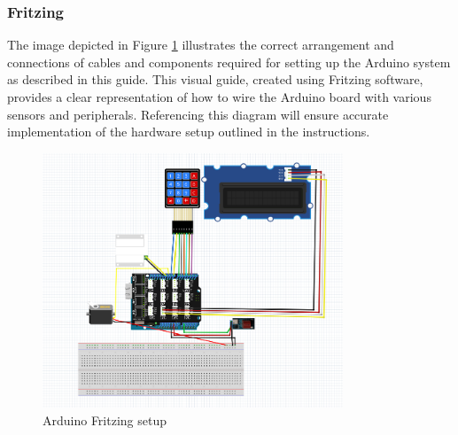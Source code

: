 \newpage
\subsubsection{Fritzing}\label{sec:ArduinoFritzing}
The image depicted in Figure \ref{fig:ardFritzing} illustrates the correct arrangement and connections of cables and components required for setting up the Arduino system as described in this guide. This visual guide, created using Fritzing software, provides a clear representation of how to wire the Arduino board with various sensors and peripherals. Referencing this diagram will ensure accurate implementation of the hardware setup outlined in the instructions.

\begin{figure}[h]
    \centering
    \includegraphics[width=0.8\textwidth]{images/Arduino/arduino_fritzing_curcuit.png}
    \caption{Arduino Fritzing setup}
    \label{fig:ardFritzing}
\end{figure}


